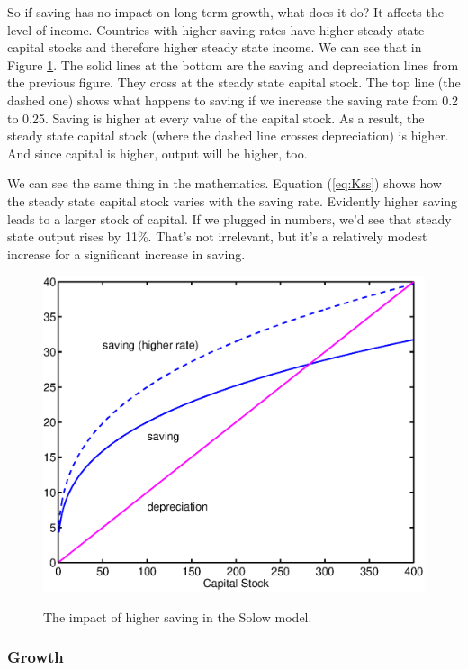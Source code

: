\documentclass[letterpaper,12pt]{article}
\begin{document}
So if saving has no impact on long-term growth, what does it do?  
It affects the level of income.  
Countries with higher saving rates have higher steady state capital stocks 
and therefore higher steady state income.  
We can see that in Figure \ref{fig:solow1a}.
The solid lines at the bottom are the saving and depreciation
lines from the previous figure.  
They cross at the steady state capital stock.  
The top line (the dashed one) shows what happens to saving if we increase 
the saving rate from 0.2 to 0.25.  
Saving is higher at every value of the capital stock.  
As a result, the steady state capital stock (where the dashed line crosses
depreciation) is higher.  
And since capital is higher, output will be higher, too.  

We can see the same thing in the mathematics.  
Equation (\ref{eq:Kss}) shows how the steady state capital stock varies 
with the saving rate.  
Evidently higher saving leads to a larger stock of capital.  
If we plugged in numbers, we'd see that 
steady state output rises by 11\%.
That's not irrelevant, but it's a relatively modest increase
for a significant increase in saving.

\begin{figure}[h]
    \centering
    \includegraphics[scale=.6]{notes_solow1a.eps}\\
    \caption{The impact of higher saving in the Solow model.}
    \label{fig:solow1a}
\end{figure}


\subsubsection*{Growth}
\end{document}
